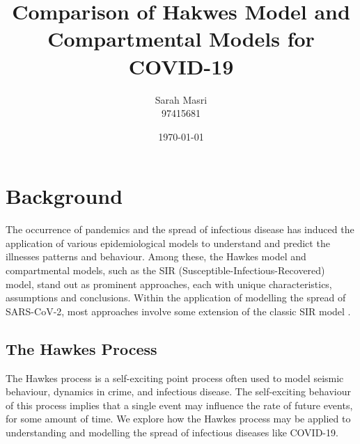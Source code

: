\documentclass[12pt]{article}
\title{Comparison of Hakwes Model and Compartmental Models for COVID-19}
\author{Sarah Masri \\ 97415681}
\date{\today}
\begin{document}
\maketitle


\thispagestyle{empty}

\begin{abstract}
\noindent  
\end{abstract}





\pagebreak
\section{Background}


The occurrence of pandemics and the spread of infectious disease has induced the application of various epidemiological models to understand and predict the illnesses patterns and behaviour. Among these, the Hawkes model and compartmental models, such as the SIR (Susceptible-Infectious-Recovered) model, stand out as prominent approaches, each with unique characteristics, assumptions and conclusions. Within the application of modelling the spread of SARS-CoV-2, most approaches involve some extension of the classic SIR model \cite{Garetto2021}.



\subsection{The Hawkes Process}

The Hawkes process is a self-exciting point process often used to model seismic behaviour, dynamics in crime, and infectious disease. The self-exciting behaviour of this process implies that a single event may influence the rate of future events, for some amount of time. We explore how the Hawkes process may be applied to understanding and modelling the spread of infectious diseases like COVID-19. 
\\
\end{document}
